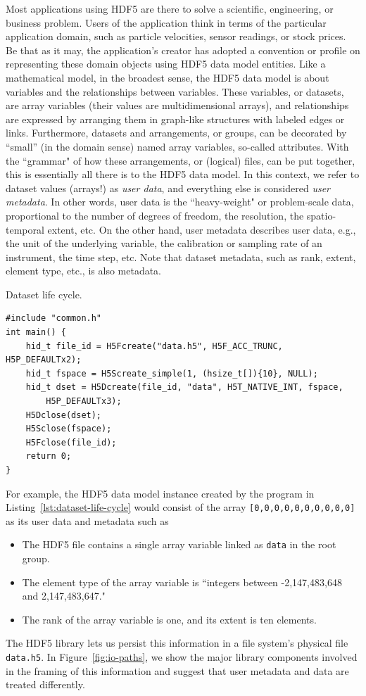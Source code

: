 Most applications using HDF5 are there to solve a scientific, engineering, or business problem. Users of the application think in terms of the particular application domain, such as particle velocities, sensor readings, or stock prices. Be that as it may, the application's creator has adopted a convention or profile on representing these domain objects using HDF5 data model entities. Like a mathematical model, in the broadest sense, the HDF5 data model is about variables and the relationships between variables. These variables, or datasets, are array variables (their values are multidimensional arrays), and relationships are expressed by arranging them in graph-like structures with labeled edges or links. Furthermore, datasets and arrangements, or groups, can be decorated by ``small'' (in the domain sense) named array variables, so-called attributes. With the ``grammar" of how these arrangements, or (logical) files, can be put together, this is essentially all there is to the HDF5 data model. In this context, we refer to dataset values (arrays!) as \textit{user data}, and everything else is considered \textit{user metadata}. In other words, user data is the ``heavy-weight" or problem-scale data, proportional to the number of degrees of freedom, the resolution, the spatio-temporal extent, etc. On the other hand, user metadata describes user data, e.g., the unit of the underlying variable, the calibration or sampling rate of an instrument, the time step, etc. Note that dataset metadata, such as rank, extent, element type, etc., is also metadata.

\begin{listing}
\centering
\caption{Dataset life cycle.}
\label{lst:dataset-life-cycle}
\begin{verbatim}
#include "common.h"
int main() {
    hid_t file_id = H5Fcreate("data.h5", H5F_ACC_TRUNC, H5P_DEFAULTx2);
    hid_t fspace = H5Screate_simple(1, (hsize_t[]){10}, NULL);
    hid_t dset = H5Dcreate(file_id, "data", H5T_NATIVE_INT, fspace,
        H5P_DEFAULTx3);
    H5Dclose(dset);
    H5Sclose(fspace);
    H5Fclose(file_id);
    return 0;
}
\end{verbatim}
\end{listing}

For example, the HDF5 data model instance created by the program in Listing~\ref{lst:dataset-life-cycle} would consist of the array \texttt{[0,0,0,0,0,0,0,0,0,0]} as its user data and metadata such as
\begin{itemize}
    \item The HDF5 file contains a single array variable linked as \texttt{data} in the root group.
    \item The element type of the array variable is ``integers between -2,147,483,648 and 2,147,483,647."
    \item The rank of the array variable is one, and its extent is ten elements.
\end{itemize}
The HDF5 library lets us persist this information in a file system's physical file \texttt{data.h5}.
In Figure~\ref{fig:io-paths}, we show the major library components involved in the framing of this information and suggest that user metadata and data are treated differently.

